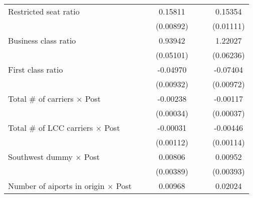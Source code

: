 \begin{table}[htbp]
\begin{tabular}{l*{6}{c}}
\addlinespace
Restricted seat ratio&                     &                     &     0.15811\sym{***}&                     &                     &     0.15354\sym{***}\\
                    &                     &                     &   (0.00892)         &                     &                     &   (0.01111)         \\
\addlinespace
Business class ratio&                     &                     &     0.93942\sym{***}&                     &                     &     1.22027\sym{***}\\
                    &                     &                     &   (0.05101)         &                     &                     &   (0.06236)         \\
\addlinespace
First class ratio   &                     &                     &    -0.04970\sym{***}&                     &                     &    -0.07404\sym{***}\\
                    &                     &                     &   (0.00932)         &                     &                     &   (0.00972)         \\
\addlinespace
Total # of carriers $\times$ Post&                     &                     &    -0.00238\sym{***}&                     &                     &    -0.00117\sym{***}\\
                    &                     &                     &   (0.00034)         &                     &                     &   (0.00037)         \\
\addlinespace
Total # of LCC carriers $\times$ Post&                     &                     &    -0.00031         &                     &                     &    -0.00446\sym{***}\\
                    &                     &                     &   (0.00112)         &                     &                     &   (0.00114)         \\
\addlinespace
Southwest dummy $\times$ Post&                     &                     &     0.00806\sym{**} &                     &                     &     0.00952\sym{**} \\
                    &                     &                     &   (0.00389)         &                     &                     &   (0.00393)         \\
\addlinespace
Number of aiports in origin $\times$ Post&                     &                     &     0.00968\sym{***}&                     &                     &     0.02024\sym{***}\\

\end{tabular}
\end{table}
